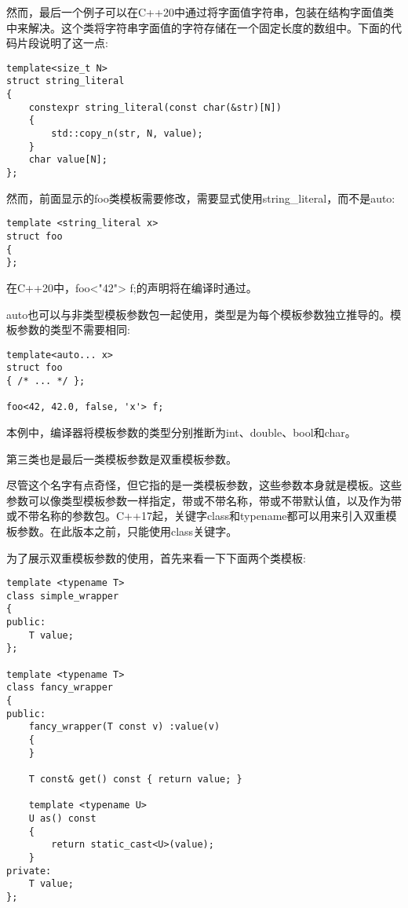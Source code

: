 然而，最后一个例子可以在C++20中通过将字面值字符串，包装在结构字面值类中来解决。这个类将字符串字面值的字符存储在一个固定长度的数组中。下面的代码片段说明了这一点:

\begin{lstlisting}[style=styleCXX]
template<size_t N>
struct string_literal
{
	constexpr string_literal(const char(&str)[N])
	{
		std::copy_n(str, N, value);
	}
	char value[N];
};
\end{lstlisting}

然而，前面显示的foo类模板需要修改，需要显式使用string\_literal，而不是auto:

\begin{lstlisting}[style=styleCXX]
template <string_literal x>
struct foo
{
};
\end{lstlisting}

在C++20中，foo<"42"> f;的声明将在编译时通过。

auto也可以与非类型模板参数包一起使用，类型是为每个模板参数独立推导的。模板参数的类型不需要相同:

\begin{lstlisting}[style=styleCXX]
template<auto... x>
struct foo
{ /* ... */ };

foo<42, 42.0, false, 'x'> f;
\end{lstlisting}

本例中，编译器将模板参数的类型分别推断为int、double、bool和char。

第三类也是最后一类模板参数是双重模板参数。


尽管这个名字有点奇怪，但它指的是一类模板参数，这些参数本身就是模板。这些参数可以像类型模板参数一样指定，带或不带名称，带或不带默认值，以及作为带或不带名称的参数包。C++17起，关键字class和typename都可以用来引入双重模板参数。在此版本之前，只能使用class关键字。

为了展示双重模板参数的使用，首先来看一下下面两个类模板:

\begin{lstlisting}[style=styleCXX]
template <typename T>
class simple_wrapper
{
public:
	T value;
};

template <typename T>
class fancy_wrapper
{
public:
	fancy_wrapper(T const v) :value(v)
	{
	}

	T const& get() const { return value; }
	
	template <typename U>
	U as() const
	{
		return static_cast<U>(value);
	}
private:
	T value;
};
\end{lstlisting}

